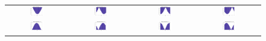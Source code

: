\begin{figure}[h]
   \centering
   \begin{tabular}{cccc}
	   \includegraphics[width=0.23\textwidth]{fig/double_1_vel_0} &
	   \includegraphics[width=0.23\textwidth]{fig/double_1_vel_pi_2} &
	   \includegraphics[width=0.23\textwidth]{fig/double_1_vel_pi} &
	   \includegraphics[width=0.23\textwidth]{fig/double_1_vel_3pi_2} \\
	   \includegraphics[width=0.23\textwidth]{fig/double_2_vel_0} &
	   \includegraphics[width=0.23\textwidth]{fig/double_2_vel_pi_2} &
	   \includegraphics[width=0.23\textwidth]{fig/double_2_vel_pi} &
	   \includegraphics[width=0.23\textwidth]{fig/double_2_vel_3pi_2} \\

\end{tabular}
\end{figure}
